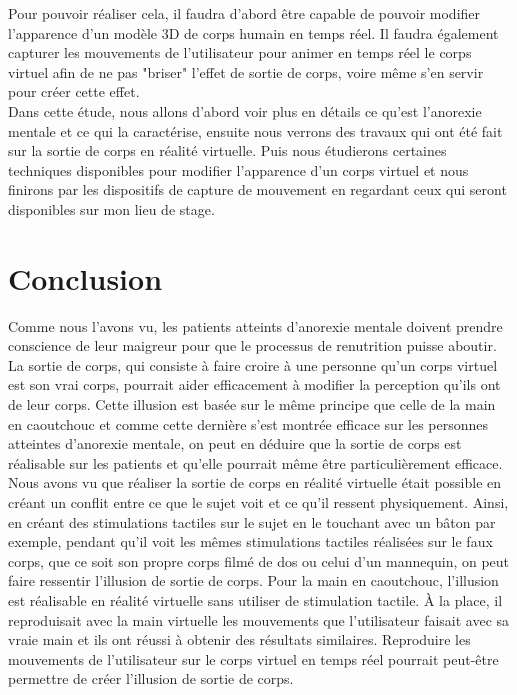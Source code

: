 \documentclass[11pt]{article}
\begin{document}
Pour pouvoir réaliser cela, il faudra d'abord être capable de pouvoir modifier l'apparence d'un modèle 3D de corps humain en temps réel. Il faudra également capturer les mouvements de l'utilisateur pour animer en temps réel le corps virtuel afin de ne pas "briser" l'effet de sortie de corps, voire même s'en servir pour créer cette effet.\\

Dans cette étude, nous allons d'abord voir plus en détails ce qu'est l'anorexie mentale et ce qui la caractérise, ensuite nous verrons des travaux qui ont été fait sur la sortie de corps en réalité virtuelle. Puis nous étudierons certaines techniques disponibles pour modifier l'apparence d'un corps virtuel et nous finirons par les dispositifs de capture de mouvement en regardant ceux qui seront disponibles sur mon lieu de stage.






\section{Conclusion}
Comme nous l'avons vu, les patients atteints d'anorexie mentale doivent prendre conscience de leur maigreur pour que le processus de renutrition puisse aboutir. La sortie de corps, qui consiste à faire croire à une personne qu'un corps virtuel est son vrai corps, pourrait aider efficacement à modifier la perception qu'ils ont de leur corps. Cette illusion est basée sur le même principe que celle de la main en caoutchouc et comme cette dernière s'est montrée efficace sur les personnes atteintes d'anorexie mentale, on peut en déduire que la sortie de corps est réalisable sur les patients et qu'elle pourrait même être particulièrement efficace.\\

Nous avons vu que réaliser la sortie de corps en réalité virtuelle était possible en créant un conflit entre ce que le sujet voit et ce qu'il ressent physiquement. Ainsi, en créant des stimulations tactiles sur le sujet en le touchant avec un bâton par exemple, pendant qu'il voit les mêmes stimulations tactiles réalisées sur le faux corps, que ce soit son propre corps filmé de dos ou celui d'un mannequin, on peut faire ressentir l'illusion de sortie de corps. Pour la main en caoutchouc, l'illusion est réalisable en réalité virtuelle sans utiliser de stimulation tactile. \`{A} la place, il reproduisait avec la main virtuelle les mouvements que l'utilisateur faisait avec sa vraie main et ils ont réussi à obtenir des résultats similaires. Reproduire les mouvements de l'utilisateur sur le corps virtuel en temps réel pourrait peut-être permettre de créer l'illusion de sortie de corps. \\
\end{document}
